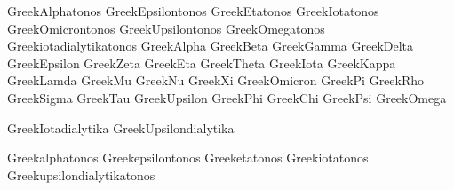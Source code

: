  GreekAlphatonos         {}
 GreekEpsilontonos       {}
 GreekEtatonos           {}
 GreekIotatonos          {}
 GreekOmicrontonos       {}
 GreekUpsilontonos       {}
 GreekOmegatonos         {}
 Greekiotadialytikatonos {}
 GreekAlpha              {}
 GreekBeta               {}
 GreekGamma              {}
 GreekDelta              {}
 GreekEpsilon            {}
 GreekZeta               {}
 GreekEta                {}
 GreekTheta              {}
 GreekIota               {}
 GreekKappa              {}
 GreekLamda              {}
 GreekMu                 {}
 GreekNu                 {}
 GreekXi                 {}
 GreekOmicron            {}
 GreekPi                 {}
 GreekRho                {}
 GreekSigma              {}
 GreekTau                {}
 GreekUpsilon            {}
 GreekPhi                {}
 GreekChi                {}
 GreekPsi                {}
 GreekOmega              {}

 GreekIotadialytika      {}
 GreekUpsilondialytika   {}

 Greekalphatonos         {}
 Greekepsilontonos       {}
 Greeketatonos           {}
 Greekiotatonos          {}
 Greekupsilondialytikatonos    {}

